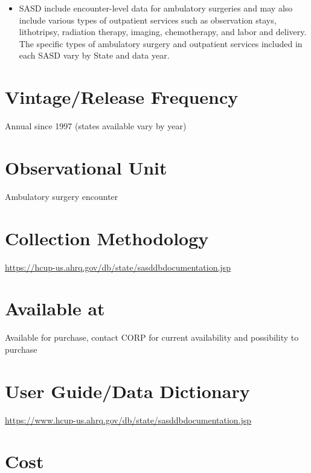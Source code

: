 \documentclass[
]{book}
\providecommand{\tightlist}{%
  \setlength{\itemsep}{0pt}\setlength{\parskip}{0pt}}
\begin{document}
\begin{itemize}
\tightlist
\item
  SASD include encounter-level data for ambulatory surgeries and may also include various types of outpatient services such as observation stays, lithotripsy, radiation therapy, imaging, chemotherapy, and labor and delivery. The specific types of ambulatory surgery and outpatient services included in each SASD vary by State and data year.
\end{itemize}

\hypertarget{vintagerelease-frequency-82}{%
\section{Vintage/Release Frequency}\label{vintagerelease-frequency-82}}

Annual since 1997 (states available vary by year)

\hypertarget{observational-unit-82}{%
\section{Observational Unit}\label{observational-unit-82}}

Ambulatory surgery encounter

\hypertarget{collection-methodology-82}{%
\section{Collection Methodology}\label{collection-methodology-82}}

\url{https://hcup-us.ahrq.gov/db/state/sasddbdocumentation.jsp}

\hypertarget{available-at-82}{%
\section{Available at}\label{available-at-82}}

Available for purchase, contact CORP for current availability and possibility to purchase

\hypertarget{user-guidedata-dictionary-82}{%
\section{User Guide/Data Dictionary}\label{user-guidedata-dictionary-82}}

\url{https://www.hcup-us.ahrq.gov/db/state/sasddbdocumentation.jsp}

\hypertarget{cost-82}{%
\section{Cost}\label{cost-82}}
\end{document}
